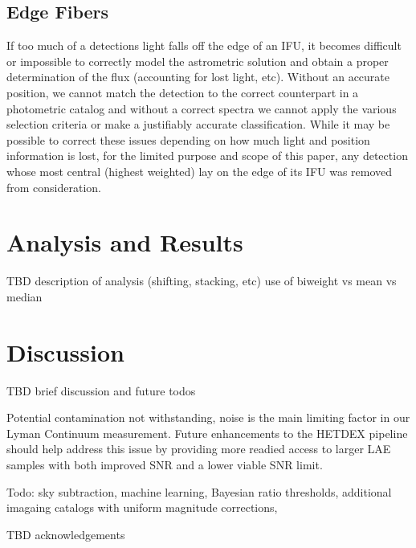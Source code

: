 \documentclass{aastex62}
\begin{document}
\subsection{Edge Fibers}
If too much of a detections light falls off the edge of an IFU, it becomes difficult or impossible to correctly model the astrometric solution and obtain a proper determination of the flux (accounting for lost light, etc). Without an accurate position, we cannot match the detection to the correct counterpart in a photometric catalog and without a correct spectra we cannot apply the various selection criteria or make a justifiably accurate classification. While it may be possible to correct these issues depending on how much light and position information is lost, for the limited purpose and scope of this paper, any detection whose most central (highest weighted) lay on the edge of its IFU was removed from consideration.


\section{Analysis and Results} \label{sec:analysis}

TBD description of analysis (shifting, stacking, etc) use of biweight vs mean vs median

\section{Discussion} \label{sec:discussion}
TBD brief discussion and future todos

Potential contamination  not withstanding, noise is the main limiting factor in our Lyman Continuum measurement. Future enhancements to the HETDEX pipeline should help address this issue by providing more readied access to larger LAE samples with both improved SNR and a lower viable SNR limit.

Todo: sky subtraction, machine learning, Bayesian ratio thresholds, additional imagaing catalogs with uniform magnitude corrections, 

\acknowledgments

TBD acknowledgements


\begin{thebibliography}{}


\end{thebibliography}


\end{document}
